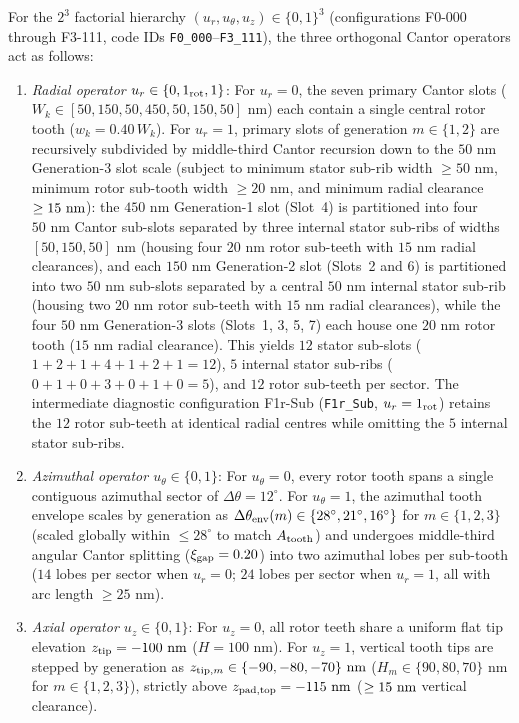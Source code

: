 \documentclass[pdflatex,sn-nature]{sn-jnl}
\begin{document}
For the $2^3$ factorial hierarchy $(u_r, u_\theta, u_z) \in \{0,1\}^3$ (configurations F0-000 through F3-111, code IDs \texttt{F0\_000}--\texttt{F3\_111}), the three orthogonal Cantor operators act as follows:
\begin{enumerate}
    \item \emph{Radial operator $u_r \in \{0, 1_{\rm rot}, 1\}$}: For $u_r = 0$, the seven primary Cantor slots ($W_k \in [50, 150, 50, 450, 50, 150, 50]\text{ nm}$) each contain a single central rotor tooth ($w_k = 0.40\,W_k$). For $u_r = 1$, primary slots of generation $m \in \{1,2\}$ are recursively subdivided by middle-third Cantor recursion down to the $50\text{ nm}$ Generation-3 slot scale (subject to minimum stator sub-rib width $\ge 50\text{ nm}$, minimum rotor sub-tooth width $\ge 20\text{ nm}$, and minimum radial clearance $\ge 15{}\text{ nm}$): the $450\text{ nm}$ Generation-1 slot (Slot~4) is partitioned into four $50\text{ nm}$ Cantor sub-slots separated by three internal stator sub-ribs of widths $[50, 150, 50]\text{ nm}$ (housing four $20\text{ nm}$ rotor sub-teeth with $15\text{ nm}$ radial clearances), and each $150\text{ nm}$ Generation-2 slot (Slots~2 and 6) is partitioned into two $50\text{ nm}$ sub-slots separated by a central $50\text{ nm}$ internal stator sub-rib (housing two $20\text{ nm}$ rotor sub-teeth with $15\text{ nm}$ radial clearances), while the four $50\text{ nm}$ Generation-3 slots (Slots~1, 3, 5, 7) each house one $20\text{ nm}$ rotor tooth ($15\text{ nm}$ radial clearance). This yields $12$ stator sub-slots ($1+2+1+4+1+2+1=12$), $5$ internal stator sub-ribs ($0+1+0+3+0+1+0=5$), and $12$ rotor sub-teeth per sector. The intermediate diagnostic configuration F1r-Sub (\texttt{F1r\_Sub}, $u_r = 1_{\rm rot}$) retains the $12$ rotor sub-teeth at identical radial centres while omitting the $5$ internal stator sub-ribs.
    \item \emph{Azimuthal operator $u_\theta \in \{0, 1\}$}: For $u_\theta = 0$, every rotor tooth spans a single contiguous azimuthal sector of $\Delta\theta = 12^\circ$. For $u_\theta = 1$, the azimuthal tooth envelope scales by generation as $\Delta\theta_{\rm env}(m) \in \{28^\circ, 21^\circ, 16^\circ\}$ for $m \in \{1,2,3\}$ (scaled globally within $\le 28^\circ$ to match $A_{\rm tooth}$) and undergoes middle-third angular Cantor splitting ($\xi_{\rm gap} = 0.20$) into two azimuthal lobes per sub-tooth ($14$ lobes per sector when $u_r = 0$; $24$ lobes per sector when $u_r = 1$, all with arc length $\ge 25\text{ nm}$).
    \item \emph{Axial operator $u_z \in \{0, 1\}$}: For $u_z = 0$, all rotor teeth share a uniform flat tip elevation $z_{\rm tip} = -100\text{ nm}$ ($H = 100\text{ nm}$). For $u_z = 1$, vertical tooth tips are stepped by generation as $z_{{\rm tip},m} \in \{-90, -80, -70\}\text{ nm}$ ($H_m \in \{90, 80, 70\}\text{ nm}$ for $m \in \{1,2,3\}$), strictly above $z_{\rm pad,top} = -115\text{ nm}$ ($\ge 15{}\text{ nm}$ vertical clearance).
\end{enumerate}
\end{document}
